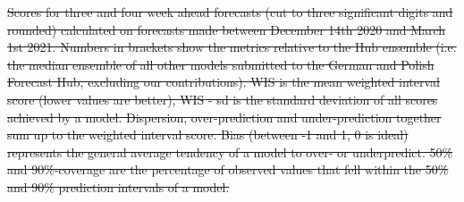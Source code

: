 \documentclass[10pt,letterpaper]{article}
\providecommand{\DIFdeltex}[1]{{\protect\color{red}\sout{#1}}}                      %
\providecommand{\DIFdelFL}[1]{\DIFdel{#1}} %
\providecommand{\DIFdel}[1]{\texorpdfstring{\DIFdeltex{#1}}{}} %
\begin{document}

{%
\DIFdelFL{Scores for three and four week ahead forecasts (cut to three significant digits and rounded) calculated on forecasts made between December 14th 2020 and March 1st 2021. Numbers in brackets show the metrics relative to the Hub ensemble (i.e. the median ensemble of all other models submitted to the German and Polish Forecast Hub, excluding our contributions). WIS is the mean weighted interval score (lower values are better), WIS - sd is the standard deviation of all scores achieved by a model. Dispersion, over-prediction and under-prediction together sum up to the weighted interval score. Bias (between -1 and 1, 0 is ideal) represents the general average tendency of a model to over- or underpredict. 50\% and 90\%-coverage are the percentage of observed values that fell within the 50\% and 90\% prediction intervals of a model.}%
\DIFdelFL{\hspace{\textwidth}}}
\end{document}
